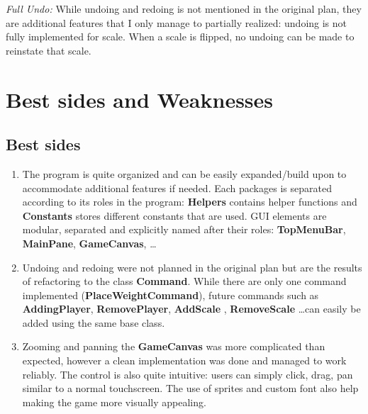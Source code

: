 \documentclass[12pt]{article}
\begin{document}
\textit{Full Undo:} While undoing and redoing is not mentioned in the original
plan, they are additional features that I only manage to partially realized:
undoing is not fully implemented for scale. When a scale is flipped, no undoing
can be made to reinstate that scale.

\section{Best sides and Weaknesses}

\subsection{Best sides}
\begin{enumerate}

  \item The program is quite organized and can be easily expanded/build upon to
    accommodate additional features if needed. Each packages is separated
    according to its roles in the program: \textbf{Helpers} contains helper
    functions and \textbf{Constants} stores different constants that are used.
    GUI elements are modular, separated and explicitly named after their roles:
    \textbf{TopMenuBar}, \textbf{MainPane}, \textbf{GameCanvas}, \dots 

  \item Undoing and redoing were not planned in the original plan but are the
    results of refactoring to the class \textbf{Command}. While there are only
    one command implemented (\textbf{PlaceWeightCommand}), future commands such
    as \textbf{AddingPlayer}, \textbf{RemovePlayer}, \textbf{AddScale} ,
    \textbf{RemoveScale} \dots can easily be added using the same base class.

  \item Zooming and panning the \textbf{GameCanvas} was more complicated than
    expected, however a clean implementation was done and managed to work
    reliably.  The control is also quite intuitive: users can simply click,
    drag, pan similar to a normal touchscreen. The use of sprites and custom
    font also help making the game more visually appealing.  
\end{enumerate}
\end{document}
